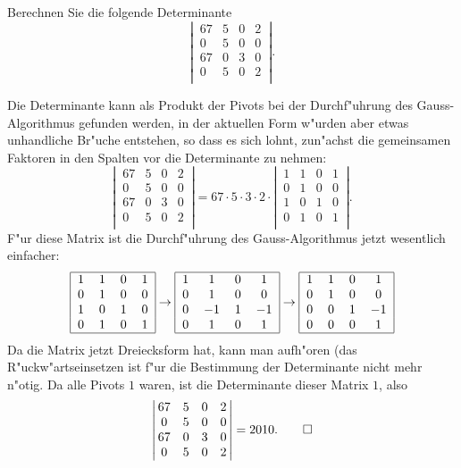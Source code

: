 Berechnen Sie die folgende Determinante
\[
\left|\,\begin{matrix}
67&5&0&2\\
0&5&0&0\\
67&0&3&0\\
0&5&0&2\\
\end{matrix}\,\right|.
\]

\begin{loesung}
Die Determinante kann als Produkt der Pivots bei der Durchf"uhrung des
Gauss-Algorithmus gefunden werden, in der aktuellen Form w"urden aber
etwas unhandliche Br"uche entstehen, so dass es sich lohnt, zun"achst
die gemeinsamen Faktoren in den Spalten vor die Determinante zu nehmen:
\[
\left|\,\begin{matrix}
67&5&0&2\\
0&5&0&0\\
67&0&3&0\\
0&5&0&2\\
\end{matrix}\,\right|
=
67\cdot5\cdot3\cdot 2\cdot
\left|\,\begin{matrix}
1&1&0&1\\
0&1&0&0\\
1&0&1&0\\
0&1&0&1\\
\end{matrix}\,\right|.
\]
F"ur diese Matrix ist die Durchf"uhrung des Gauss-Algorithmus jetzt
wesentlich einfacher:
\[
\begin{tabular}{|cccc|}
\hline
1&1&0&1\\
0&1&0&0\\
1&0&1&0\\
0&1&0&1\\
\hline
\end{tabular}
\rightarrow
\begin{tabular}{|cccc|}
\hline
1&1&0&1\\
0&1&0&0\\
0&$-1$&1&$-1$\\
0&1&0&1\\
\hline
\end{tabular}
\rightarrow
\begin{tabular}{|cccc|}
\hline
1&1&0&1\\
0&1&0&0\\
0&0&1&$-1$\\
0&0&0&1\\
\hline
\end{tabular}
\]
Da die Matrix jetzt Dreiecksform hat, kann man aufh"oren
(das R"uckw"artseinsetzen ist f"ur die Bestimmung der
Determinante nicht mehr n"otig. Da alle Pivots $1$ waren, ist
die Determinante dieser Matrix $1$, also
\[
\left|\,\begin{matrix}
67&5&0&2\\
0&5&0&0\\
67&0&3&0\\
0&5&0&2\\
\end{matrix}\,\right|=2010.
\qedhere
\]
\end{loesung}

